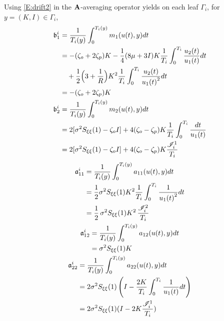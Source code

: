 Using \eqref{E:drift2} in the $\operatorname{\mathbf A}$-averaging operator yields on each leaf $\Gamma_i$, for $y=(K,I) \in \Gamma_i$,
\begin{gather}
\begin{split}
\mathfrak b_1^i &= \frac{1}{T_i(y)}\int_{0}^{T_i(y)} m_1(u(t),y) dt\\
&= -(\zeta_o+2\zeta_p) K -\frac14 (8\mu + 3I) K \frac{1}{T_i} \int_0^{T_i} \frac{u_2(t)}{u_1(t)} dt\\
&\quad + \frac12 \Bigl(3 + \frac{1}{R} \Bigr) K^2
\frac{1}{T_i} \int_{0}^{T_i}
\frac{u_2(t)}{{u_1(t)}^2} dt\\
&= -(\zeta_o + 2\zeta_p) K
\end{split}
\label{E:drift h}\\
\begin{split}
\mathfrak b_2^i & = \frac{1}{T_i(y)}\int_{0}^{T_i(y)} m_2(u(t),y) dt\\
& = 2 [\sigma^2 S_{\xi\xi}(1) - \zeta_o I] + 4(\zeta_o-\zeta_p) K
\frac{1}{T_i}\int_{0}^{T_i}\frac{dt}{u_1(t)}\\
& = 2 [\sigma^2 S_{\xi\xi}(1) - \zeta_o I] + 4(\zeta_o-\zeta_p) K \frac{\mathscr I_{i}^1}{T_i}
\end{split}
\end{gather}
\begin{gather}
\begin{split}
\mathfrak a_{11}^i & = \frac{1}{T_i(y)}\int_{0}^{T_i(y)} a_{11}(u(t),y) dt\\
&= \frac12 \sigma^2 S_{\xi\xi}(1) K^2 \frac{1}{T_i}\int_0^{T_i}
\frac{1}{{u_1(t)}^2}dt\\
&=\frac12\,{\sigma}^2S_{\xi\xi}(1){K}^2\,\frac{\mathscr I_{i}^2}{T_i}
\end{split}\\
\begin{split}
\mathfrak a_{12}^{i} &= \frac{1}{T_i(y)}\int_{0}^{T_i(y)} a_{12}(u(t),y)dt\\
&= \sigma^2 S_{\xi\xi}(1) K
\label{E:diffusion hi}
\end{split}
\\
\begin{split}
\mathfrak a_{22}^i &= \frac{1}{T_i(y)} \int_0^{T_i(y)} a_{22}(u(t),y)dt\\
&= 2 \sigma^2 S_{\xi\xi}(1) \left(I - \frac{2 K}{T_i} \int_0^{T_i} \frac{1}{u_1(t)}dt \right)\\
&= 2 \sigma^2 S_{\xi\xi}(1) (I - 2 K \frac{\mathscr I_i^1}{T_i})
\end{split}
\end{gather}
